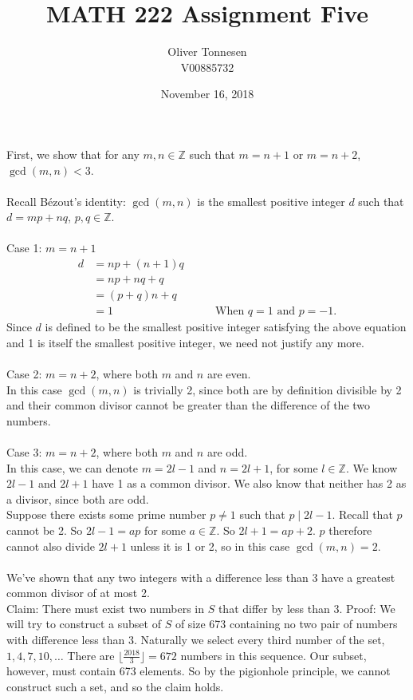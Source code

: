 \documentclass{article}
\title{MATH 222 Assignment Five}
\author{Oliver Tonnesen\\V00885732}
\date{November 16, 2018}
\begin{document}
\maketitle
\renewcommand{\thesubsection}{\thesection.\alph{subsection}}
\section{} %
First, we show that for any $m,n\in\mathbb{Z}$ such that $m=n+1$ or $m=n+2$,
$\gcd(m,n)<3$.\\\\
Recall B\'ezout's identity: $\gcd(m,n)$ is the smallest positive integer $d$
such that $d=mp+nq$, $p,q\in\mathbb{Z}$.\\\\
Case 1: $m=n+1$\\
\begin{align*}
	d&=np+(n+1)q\\
	&=np+nq+q\\
	&=(p+q)n+q\\
	&=1&\qquad\text{When $q=1$ and $p=-1$.}
\end{align*}
Since $d$ is defined to be the smallest positive integer satisfying the above
equation and 1 is itself the smallest positive integer, we need not justify
any more.\\\\
Case 2: $m=n+2$, where both $m$ and $n$ are even.\\
In this case $\gcd(m,n)$ is trivially 2, since both are by definition divisible
by 2 and their common divisor cannot be greater than the difference of the two
numbers.\\\\
Case 3: $m=n+2$, where both $m$ and $n$ are odd.\\
In this case, we can denote $m=2l-1$ and $n=2l+1$, for some $l\in\mathbb{Z}$.
We know $2l-1$ and $2l+1$ have 1 as a common divisor. We also know that neither
has 2 as a divisor, since both are odd.\\
Suppose there exists some prime number $p\neq1$ such that $p \mid 2l-1$.
Recall that $p$ cannot be 2. So $2l-1=ap$ for some $a\in\mathbb{Z}$. So
$2l+1=ap+2$. $p$ therefore cannot also divide $2l+1$ unless it is 1 or 2, so in
this case $\gcd(m,n)=2$.\\\\
We've shown that any two integers with a difference less than 3 have a greatest
common divisor of at most 2.\\
Claim: There must exist two numbers in $S$ that differ by less than 3.
Proof: We will try to construct a subset of $S$ of size 673 containing no two
pair of numbers with difference less than 3. Naturally we select every third
number of the set, $1,4,7,10,\ldots$ There are
$\big\lfloor\frac{2018}{3}\big\rfloor=672$ numbers in this sequence. Our subset,
however, must contain 673 elements. So by the pigionhole principle, we cannot
construct such a set, and so the claim holds.
\end{document}
